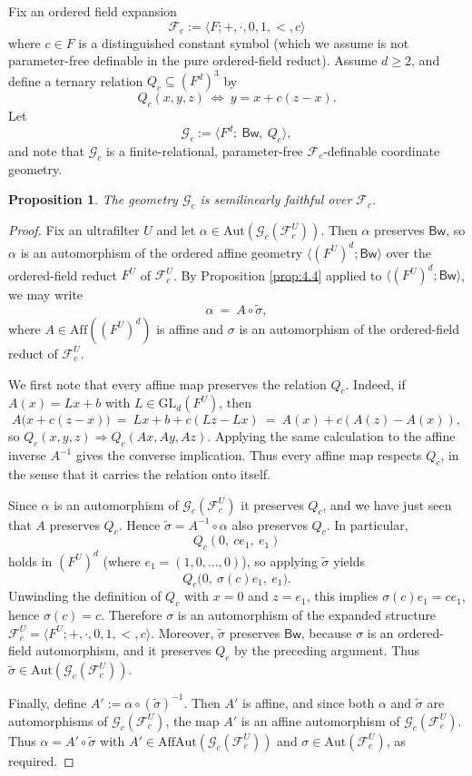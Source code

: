 \documentclass[11pt,a4paper]{article}
\newcommand{\G}{\mathcal{G}}
\newcommand{\F}{\mathcal{F}}
\newtheorem{proposition}[theorem]{Proposition}
\theoremstyle{definition}
\begin{document}
Fix an ordered field expansion \[
\F_c:=\langle F;+ ,\cdot,0,1,<,c\rangle
\] where $c\in F$ is a distinguished constant symbol (which we assume is not
parameter-free definable in the pure ordered-field reduct).
Assume $d\ge 2$, and define a ternary relation $Q_c\subseteq (F^d)^3$ by \[
Q_c(x,y,z)\ \iff\ y=x+c(z-x).
\] Let \[
\G_c:=\langle F^d;\ \mathsf{Bw},\ Q_c\rangle,
\] and note that $\G_c$ is a finite-relational, parameter-free
$\F_c$-definable coordinate geometry.


\begin{proposition}
	\label{prop:8.1}
The geometry $\G_c$ is semilinearly faithful
over $\F_c$.
\end{proposition}

\begin{proof}
Fix an ultrafilter $U$ and let
$\alpha\in \mathrm{Aut}(\G_c(\F_c^U))$. Then $\alpha$
preserves $\mathsf{Bw}$, so $\alpha$ is an automorphism of the
ordered affine geometry $\langle (F^U)^d;\mathsf{Bw}\rangle$ over the
ordered-field reduct $F^U$ of $\F_c^U$. By Proposition \ref{prop:4.4}
applied to $\langle (F^U)^d;\mathsf{Bw}\rangle$, we may write \[
\alpha \ =\ A\circ \widetilde\sigma,
\] where $A\in \mathrm{Aff}((F^U)^d)$ is affine and $\sigma$ is an
automorphism of the ordered-field reduct of $\F_c^U$.

We first note that every affine map preserves the relation $Q_c$.
Indeed, if $A(x)=Lx+b$ with $L\in \mathrm{GL}_d(F^U)$, then \[
A\big(x+c(z-x)\big) \ =\ Lx+b+c(Lz-Lx)\ =\ A(x)+c(A(z)-A(x)),
\] so $Q_c(x,y,z)\Rightarrow Q_c(Ax,Ay,Az)$. Applying the same
calculation to the affine inverse $A^{-1}$ gives the converse
implication. Thus every affine map respects $Q_c$, in the sense that
it carries the relation onto itself.

Since $\alpha$ is an automorphism of $\G_c(\F_c^U)$ it
preserves $Q_c$, and we have just seen that $A$ preserves $Q_c$.
Hence $\widetilde\sigma = A^{-1}\circ \alpha$ also preserves $Q_c$.
In particular, \[
Q_c(0,\ c e_1,\ e_1)
\] holds in $(F^U)^d$ (where $e_1=(1,0,\dots,0)$), so applying
$\widetilde\sigma$ yields \[
Q_c\big(0,\ \sigma(c)e_1,\ e_1\big).
\] Unwinding the definition of $Q_c$ with $x=0$ and $z=e_1$, this
implies $\sigma(c)e_1 = c e_1$, hence $\sigma(c)=c$. Therefore
$\sigma$ is an automorphism of the expanded structure
$\F_c^U=\langle F^U;+,\cdot,0,1,<,c\rangle$. Moreover,
$\widetilde\sigma$ preserves $\mathsf{Bw}$, because $\sigma$ is an
ordered-field automorphism, and it preserves $Q_c$ by the preceding argument.
Thus $\widetilde\sigma\in\mathrm{Aut}(\G_c(\F_c^U))$.

Finally, define $A':=\alpha\circ (\widetilde\sigma)^{-1}$. Then $A'$
is affine, and since both $\alpha$ and $\widetilde\sigma$ are
automorphisms of $\G_c(\F_c^U)$, the map $A'$ is an affine
automorphism of $\G_c(\F_c^U)$. Thus
$\alpha=A'\circ \widetilde\sigma$ with
$A'\in \mathrm{AffAut}(\G_c(\F_c^U))$ and
$\sigma\in \mathrm{Aut}(\F_c^U)$, as required.
\end{proof}
\end{document}
